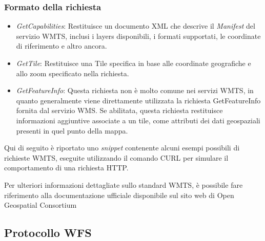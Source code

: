 \subsubsection{Formato della richiesta}

\begin{itemize}
      \item \textit{GetCapabilities}: Restituisce un documento XML che descrive il \textit{Manifest} del servizio WMTS, inclusi i layers disponibili, i formati supportati, le coordinate di riferimento e altro ancora.
      \item \textit{GetTile}: Restituisce una Tile specifica in base alle coordinate geografiche e allo zoom specificato nella richiesta.
      \item \textit{GetFeatureInfo}: Questa richiesta non è molto comune nei servizi WMTS, in quanto generalmente viene direttamente utilizzata la richiesta GetFeatureInfo fornita dal servizio WMS. Se abilitata, questa richiesta restituisce informazioni aggiuntive associate a un tile, come attributi dei dati geospaziali presenti in quel punto della mappa.
\end{itemize}
Qui di seguito è riportato uno \textit{snippet} contenente alcuni esempi possibili di richieste WMTS, eseguite utilizzando il comando CURL per simulare il comportamento di una richiesta HTTP.


Per ulteriori informazioni dettagliate sullo standard WMTS, è possibile fare riferimento alla documentazione ufficiale disponibile sul sito web di Open Geospatial Consortium \cite{DocumentazioneWMTS}

\subsection{Protocollo WFS}

